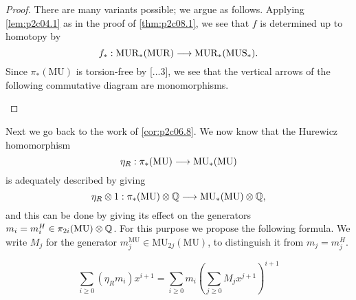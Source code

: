 \documentclass[../main]{subfiles}
\begin{document}
\begin{proof}
There are many variants possible; we argue as follows. Applying \eqref{lem:p2c04.1} as in the proof of \eqref{thm:p2c08.1}, we see that $f$ is determined up to homotopy by $$f_\ast : \mathrm{MUR}_\ast(\mathrm{MUR}) \overset{}{\longrightarrow} \mathrm{MUR}_\ast(\mathrm {MUS}_\ast).$$ Since $\pi_\ast(\mathrm{MU})$ is torsion-free by [...3], we see that the vertical arrows of the following commutative diagram are monomorphisms.

\begin{center}
\end{center}
\end{proof}

Next we go back to the work of \eqref{cor:p2c06.8}. We now know that the Hurewicz homomorphism $$\eta_R : \pi_\ast (\mathrm{MU}) \overset{}{\longrightarrow} \mathrm {MU}_\ast (\mathrm {MU})$$ is adequately described by giving $$\eta_R \otimes 1 : \pi_\ast(\mathrm {MU}) \otimes \mathbb{Q} \overset{}{\longrightarrow} \mathrm{MU}_\ast(\mathrm {MU}) \otimes \mathbb{Q},$$ and this can be done by giving its effect on the generators $m_i = m_i^H \in \pi_{2i} (\mathrm{MU}) \otimes \mathbb{Q}$. For this purpose we propose the following formula. We write $M_j$ for the generator $m_j^{\mathrm{MU}} \in \mathrm{MU}_{2j} (\mathrm {MU})$, to distinguish it from $m_j = m_j^H$.

\begin{proposition}
\label{prop:p2c09.4}
$$\sum_{i \ge 0} (\eta_R m_i)x^{i + 1} = \sum_{i \ge 0} m_i \left(\sum_{j \ge 0} M_j x^{j + 1}\right)^{i + 1}$$
\end{proposition}
\end{document}
